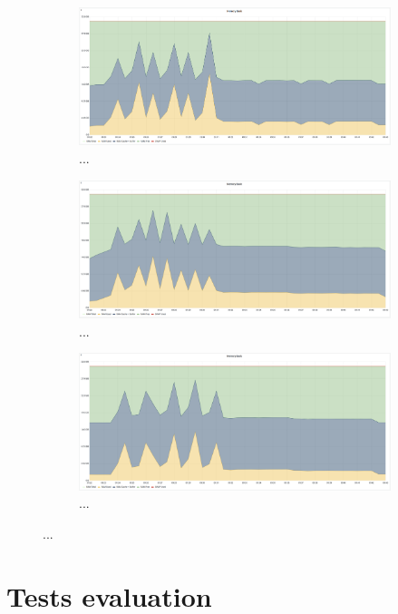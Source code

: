 \begin{figure}[H]
    \begin{subfigure}[h]{0.5\linewidth}
        \centering
        \includegraphics[width=1\linewidth]{other-fig/tests/overload_ram1.png}
        \caption{...}
    \end{subfigure}
    \hfill
    \begin{subfigure}[h]{0.5\linewidth}
        \centering
        \includegraphics[width=1\linewidth]{other-fig/tests/overload_ram2.png}
        \caption{...}
    \end{subfigure}
    \begin{subfigure}[h]{1\linewidth}
        \centering
        \includegraphics[width=0.5\linewidth]{other-fig/tests/overload_ram3.png}
        \caption{...}
    \end{subfigure}
    \caption{...}
\end{figure}

\section{Tests evaluation}

